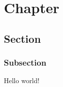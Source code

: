 \documentclass[a4paper,spanish,12pt]{report}
\newcommand{\cbp}[3]{}
\begin{document}

%


\chapter{Chapter}
\section{Section}
\subsection{Subsection}

Hello world!
\end{document}

